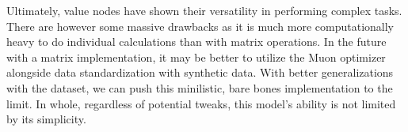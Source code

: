 Ultimately, value nodes have shown their versatility in performing complex tasks.
There are however some massive drawbacks as it is much more computationally 
heavy to do individual calculations than with matrix operations. In the future 
with a matrix implementation, it may be better to utilize the Muon optimizer
alongside data standardization with synthetic data. With better generalizations with the dataset, 
we can push this minilistic, bare bones implementation to the limit. In whole, regardless of potential tweaks, 
this model's ability is not limited by its simplicity.
